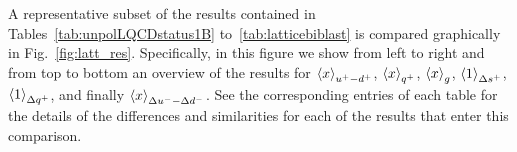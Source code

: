 A representative subset of the results contained in
Tables~\ref{tab:unpolLQCDstatus1B} to~\ref{tab:latticebiblast}
is compared graphically in  
Fig.~\ref{fig:latt_res}.
%
Specifically, in this figure we show from left to right and from top to bottom
an overview of 
  the results for $\left\langle x\right\rangle_{u^+-d^+}$, $\left\langle x\right\rangle_{q^+}$, $\left\langle x\right\rangle_{g}$,
  $\left\langle 1 \right\rangle_{\Delta s^+}$, $\left\langle 1\right\rangle_{\Delta q^+}$, and finally
  $\left\langle x\right\rangle_{\Delta u^- - \Delta d^-}$.
  See the corresponding entries of each table for
  the details of the differences and similarities for each
  of the results that enter this comparison.

\begin{figure}[t]
\begin{center}
\centerline{
}
\centerline{
}
\end{center}
\end{figure}
